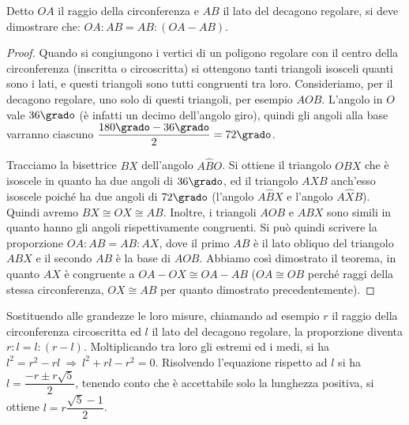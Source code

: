 Detto \(OA\) il raggio della circonferenza e \(AB\) il lato del decagono 
regolare, si deve dimostrare che: \(OA:AB=AB:(OA-AB)\).

\begin{figure*}[!htb]
	\begin{center}
		\begin{minipage}{0.45\textwidth}
			\centering
			
		\end{minipage}
		\hspace{0.03\textwidth}	
		\begin{minipage}{0.45\textwidth}
			\centering
			
		\end{minipage}
	\end{center}
\end{figure*}

\begin{proof}
Quando si congiungono i vertici di un poligono regolare con il centro 
della circonferenza (inscritta o circoscritta) si ottengono tanti 
triangoli isosceli quanti sono i lati, e questi triangoli sono tutti 
congruenti tra loro.
Consideriamo, per il decagono regolare, uno solo di questi triangoli, 
per esempio \(AOB\). L'angolo in \(O\) vale \(36\grado\) (è infatti un 
decimo dell'angolo giro), quindi gli angoli alla base varranno 
ciascuno \(\dfrac{180\grado-36\grado}{2} = 72\grado\).

Tracciamo la bisettrice \(BX\) dell'angolo \(A\widehat{B}O\). Si ottiene 
il triangolo \(OBX\) che è isoscele in quanto ha due angoli di 
\(36\grado\), ed il triangolo \(AXB\) anch'esso isoscele poiché ha due 
angoli di \(72\grado\) (l'angolo \(A\widehat{B}X\) e l'angolo 
\(A\widehat{X}B\)).  
Quindi avremo \(BX\cong OX\cong AB\).
Inoltre, i triangoli \(AOB\) e \(ABX\) sono simili in quanto hanno gli 
angoli rispettivamente congruenti.
Si può quindi scrivere la proporzione \(OA:AB=AB:AX\), dove il primo 
\(AB\) è il lato obliquo del triangolo \(ABX\) e il secondo \(AB\) è la 
base di \(AOB\).
Abbiamo così dimostrato il teorema, in quanto \(AX\) è congruente a 
\(OA-OX \cong OA-AB\) (\(OA\cong OB\) perché raggi della stessa 
circonferenza, \(OX\cong AB\) per quanto dimostrato precedentemente).
\end{proof}

Sostituendo alle grandezze le loro misure, chiamando ad esempio \(r\) 
il raggio della circonferenza circoscritta ed \(l\) il lato del 
decagono regolare, la proporzione diventa \(r:l=l:(r-l)\).
Moltiplicando tra loro gli estremi ed i medi, si ha \(l^2=r^2-rl 
\:\Rightarrow\: l^2+rl-r^2=0\).
Risolvendo l'equazione rispetto ad \(l\) si ha \(l=\dfrac{-r\pm 
r\sqrt{5}}{2}\), tenendo conto che è accettabile solo la lunghezza 
positiva, si ottiene \(l=r\dfrac{\sqrt{5}-1}{2}\).

